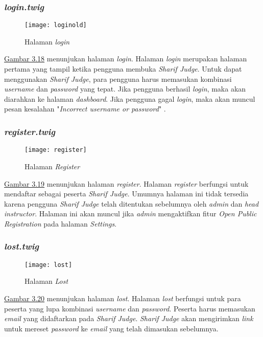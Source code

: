 \subsubsection{\textit{login.twig}}
\begin{figure}[H]
	\centering  
	\texttt{[image: loginold]}  
	\caption[Halaman \textit{Login}]{Halaman \textit{login}} 
	\label{fig:oldlogin} 
\end{figure} 
\hyperref[fig:oldlogin]{Gambar 3.18} menunjukan halaman \textit{login}. Halaman \textit{login} merupakan halaman pertama yang tampil ketika pengguna membuka \textit{Sharif Judge}. Untuk dapat menggunakan \textit{Sharif Judge}, para pengguna harus memasukan kombinasi \textit{username} dan \textit{password} yang tepat. Jika pengguna berhasil \textit{login}, maka akan diarahkan ke halaman \textit{dashboard}. Jika pengguna gagal \textit{login}, maka akan muncul pesan kesalahan "\textit{Incorrect username or password}" .

\subsubsection{\textit{register.twig}}
\begin{figure}[H]
	\centering  
	\texttt{[image: register]}  
	\caption[Halaman \textit{Register}]{Halaman \textit{Register}} 
	\label{fig:register} 
\end{figure} 
\hyperref[fig:register]{Gambar 3.19} menunjukan halaman \textit{register}. Halaman \textit{register} berfungsi untuk mendaftar sebagai peserta \textit{Sharif Judge}. Umumnya halaman ini tidak tersedia karena pengguna \textit{Sharif Judge} telah ditentukan sebelumnya oleh \textit{admin} dan \textit{head instructor}. Halaman ini akan muncul jika \textit{admin} mengaktifkan fitur \textit{Open Public Registration} pada halaman \textit{Settings}.

\subsubsection{\textit{lost.twig}}
\begin{figure}[H]
	\centering  
	\texttt{[image: lost]}  
	\caption[Halaman \textit{Lost}]{Halaman \textit{Lost}} 
	\label{fig:lost} 
\end{figure} 
\hyperref[fig:lost]{Gambar 3.20} menunjukan halaman \textit{lost}. Halaman \textit{lost} berfungsi untuk para peserta yang lupa kombinasi \textit{username} dan \textit{password}. Peserta harus memasukan \textit{email} yang didaftarkan pada \textit{Sharif Judge}. \textit{Sharif Judge} akan mengirimkan \textit{link} untuk mereset \textit{password} ke \textit{email} yang telah dimasukan sebelumnya.

